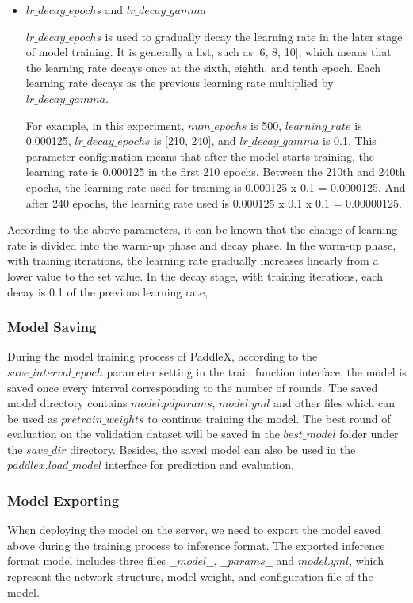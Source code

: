 \documentclass[sensors,article,submit,moreauthors,pdftex]{Definitions/mdpi}
\begin{document}
\begin{paracol}{2}
\begin{itemize}
\item{$lr\_decay\_epochs$} and {$lr\_decay\_gamma$}

$lr\_decay\_epochs$ is used to gradually decay the learning rate in the later stage of model training. It is generally a list, such as [6, 8, 10], which means that the learning rate decays once at the sixth, eighth, and tenth epoch. Each learning rate decays as the previous learning rate multiplied by $lr\_decay\_gamma$.

For example, in this experiment, $num\_epochs$ is 500, $learning\_rate$ is 0.000125, $lr\_decay\_epochs$ is [210, 240], and $lr\_decay\_gamma$ is 0.1. This parameter configuration means that after the model starts training, the learning rate is 0.000125 in the first 210 epochs. Between the 210th and 240th epochs, the learning rate used for training is 0.000125 x 0.1 = 0.0000125. And after 240 epochs, the learning rate used is 0.000125 x 0.1 x 0.1 = 0.00000125.

\end{itemize}

According to the above parameters, it can be known that the change of learning rate is divided into the warm-up phase and decay phase. In the warm-up phase, with training iterations, the learning rate gradually increases linearly from a lower value to the set value. In the decay stage, with training iterations, each decay is 0.1 of the previous learning rate,

\subsubsection{Model Saving}
During the model training process of PaddleX, according to the $save\_interval\_epoch$ parameter setting in the train function interface, the model is saved once every interval corresponding to the number of rounds. The saved model directory contains $model.pdparams$, $model.yml$ and other files which can be used as $pretrain\_weights$ to continue training the model. The best round of evaluation on the validation dataset will be saved in the $best\_model$ folder under the $save\_dir$ directory. Besides, the saved model can also be used in the $paddlex.load\_model$ interface for prediction and evaluation.



\subsubsection{Model Exporting}
When deploying the model on the server, we need to export the model saved above during the training process to inference format. The exported inference format model includes three files $\_\_model\_\_$, $\_\_params\_\_$ and $model.yml$, which represent the network structure, model weight, and configuration file of the model.


\end{paracol}
\end{document}

